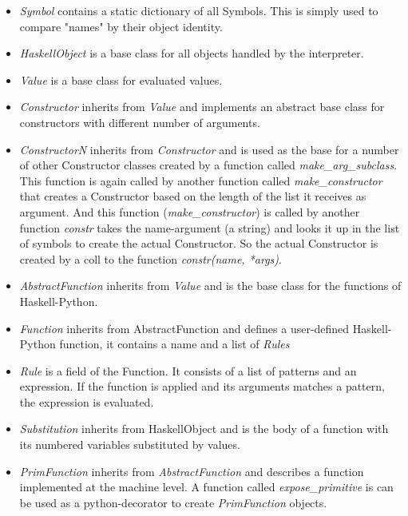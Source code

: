 \begin{itemize}

\item \emph{Symbol} contains a static dictionary of all Symbols. This is 
simply used to compare "names" by their object identity.

\item \emph{HaskellObject} is a base class for all objects handled by the
interpreter.

\item \emph{Value} is a base class for evaluated values.

\item \emph{Constructor} inherits from \emph{Value} and implements an abstract 
base class for constructors with different number of arguments.

\item \emph{ConstructorN} inherits from \emph{Constructor} and is used as the 
base for a number of other Constructor classes created by a function called 
\emph{make\_arg\_subclass}. This function is again called by another function
called \emph{make\_constructor} that creates a Constructor based on the length
of the list it receives as argument. And this function (\emph{make\_constructor})
is called by another function \emph{constr} takes the name-argument (a string)
and looks it up in the list of symbols to create the actual Constructor. So the
actual Constructor is created by a coll to the function \emph{constr(name, *args)}.

\item \emph{AbstractFunction} inherits from \emph{Value} and is the base class for 
the functions of Haskell-Python. 

\item \emph{Function} inherits from AbstractFunction and defines a user-defined 
Haskell-Python function, it contains a name and a list of \emph{Rules}

\item \emph{Rule} is a field of the Function. It consists of a list of patterns and
an expression. If the function is applied and its arguments matches a pattern, the
expression is evaluated.

\item \emph{Substitution} inherits from HaskellObject and is the body of a function 
with its numbered variables substituted by values.

\item \emph{PrimFunction} inherits from \emph{AbstractFunction} and describes a function
implemented at the machine level. A function called \emph{expose\_primitive} is
can be used as a python-decorator to create \emph{PrimFunction} objects.


\end{itemize}

